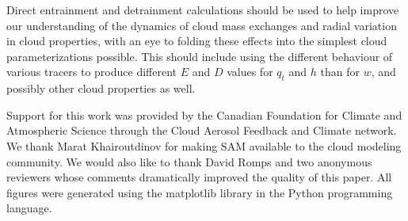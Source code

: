 \documentclass[12pt]{article}
\begin{document}
Direct entrainment and detrainment calculations should be used to help 
improve our understanding of the dynamics of cloud mass exchanges and 
radial variation in cloud properties, with an eye to folding these effects
into the simplest cloud parameterizations possible.  This should include 
using the different behaviour of various tracers to produce different 
$E$ and $D$ values for $q_t$ and $h$ than for $w$, and possibly other cloud 
properties as well.

\begin{acknowledgment} 
Support for this work was provided by the Canadian Foundation for Climate and 
Atmospheric Science through the Cloud Aerosol Feedback and Climate network.
We thank Marat Khairoutdinov for making SAM available to the cloud modeling 
community.  We would also like to thank David Romps and two anonymous 
reviewers whose comments dramatically improved the quality of this paper.  
All figures were generated using the matplotlib library in the Python 
programming language.
\end{acknowledgment}

{}
{\clearpage}

{}
{\clearpage}



\end{document}
